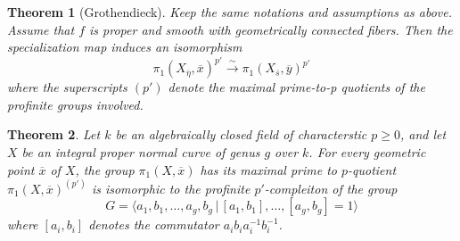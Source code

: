 \documentclass{article}
\newtheorem{theorem}{Theorem}[section]
\theoremstyle{definition}
\theoremstyle{remark}
\begin{document}
\begin{theorem}[Grothendieck]
	Keep the same notations and assumptions as above.
	Assume that $f$ is proper and smooth with geometrically connected fibers.
	Then the specialization map induces an isomorphism 
	\[\pi_1(X_{\overline{\eta}}, \overline{x})^{p'} \xrightarrow{\sim} \pi_1(X_{\overline{s}}, \overline{y})^{p'}\]
	where the superscripts $(p')$ denote the maximal prime-to-p quotients of the profinite groups involved.
	
\end{theorem}

\begin{theorem}
	Let $k$ be an algebraically closed field of characterstic $p \geq 0$, and let $X$ be an integral proper normal curve of genus $g$ over $k$.
	For every geometric point $\overline{x}$ of $X$, the group $\pi_1(X, \overline{x})$ has its maximal prime to $p$-quotient $\pi_1(X, \overline{x})^{(p')}$ is isomorphic to the profinite $p'$-compleiton of the group
	\[G = \langle a_1, b_1, \dots, a_g, b_g \,|\, [a_1,b_1], \dots, [a_g, b_g] = 1\rangle\]
	where $[a_i, b_i]$ denotes the commutator $a_i b_i a_i^{-1} b_i^{-1}$.
\end{theorem}




\end{document}
